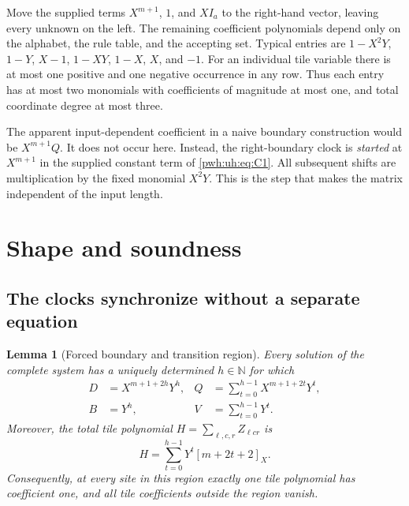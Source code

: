 \documentclass[11pt,letterpaper]{article}
\numberwithin{equation}{section}
\newtheorem{lemma}[theorem]{Lemma}
\theoremstyle{definition}
\newcommand{\N}{\mathbb N}
\newcommand{\rep}[1]{[#1]_X}
\begin{document}
Move the supplied terms $X^{m+1}$, $1$, and $XI_a$ to the right-hand
vector, leaving every unknown on the left. The remaining coefficient
polynomials depend only on the alphabet, the rule table, and the
accepting set. Typical entries are $1-X^2Y$, $1-Y$, $X-1$, $1-XY$,
$1-X$, $X$, and $-1$. For an individual tile variable there is at most
one positive and one negative occurrence in any row. Thus each entry has
at most two monomials with coefficients of magnitude at most one, and
total coordinate degree at most three.

The apparent input-dependent coefficient in a naive boundary construction
would be $X^{m+1}Q$. It does not occur here. Instead, the right-boundary
clock is \emph{started} at $X^{m+1}$ in the supplied constant term of
\eqref{pwh:uh:eq:C1}. All subsequent shifts are multiplication by the fixed
monomial $X^2Y$. This is the step that makes the matrix independent of the
input length.

\section{Shape and soundness}
\label{pwh:uh:sec:correctness}

\subsection{The clocks synchronize without a separate equation}

\begin{lemma}[Forced boundary and transition region]
\label{pwh:uh:lem:shape}
Every solution of the complete system has a uniquely determined
$h\in\N$ for which
\begin{align}
 D&=X^{m+1+2h}Y^h,
 &Q&=\sum_{t=0}^{h-1}X^{m+1+2t}Y^t,\label{pwh:uh:eq:DQ}\\
 B&=Y^h,
 &V&=\sum_{t=0}^{h-1}Y^t.\label{pwh:uh:eq:BV}
\end{align}
Moreover, the total tile polynomial $H=\sum_{\ell,c,r}Z_{\ell c r}$ is
\begin{equation}
 H=\sum_{t=0}^{h-1}Y^t\rep{m+2t+2}.
 \label{pwh:uh:eq:Hshape}
\end{equation}
Consequently, at every site in this region exactly one tile polynomial
has coefficient one, and all tile coefficients outside the region vanish.
\end{lemma}
\end{document}
